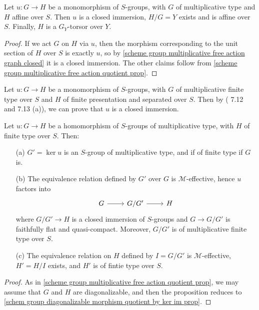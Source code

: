 \begin{corollary}\label{scheme group mono multiplicative to affine prop}
Let $u:G\to H$ be a monomorphism of $S$-groups, with $G$ of multiplicative type and $H$ affine over $S$. Then $u$ is a closed immersion, $H/G=Y$ exists and is affine over $S$. Finally, $H$ is a $G_Y$-torsor over $Y$.
\end{corollary}
\begin{proof}
If we act $G$ on $H$ via $u$, then the morphism corresponding to the unit section of $H$ over $S$ is exactly $u$, so by \cref{scheme group multiplicative free action graph closed} it is a closed immersion. The other claims follow from \cref{scheme group multiplicative free action quotient prop}.
\end{proof}

\begin{remark}\label{scheme group mono multiplicative to fp sp prop}
Let $u:G\to H$ be a monomorphism of $S$-groups, with $G$ of multiplicative finite type over $S$ and $H$ of finite presentation and separated over $S$. Then by (\cite{SGA3-2}  7.12 and 7.13 (a)), we can prove that $u$ is a closed immersion.
\end{remark}

\begin{proposition}\label{scheme group multiplicative morphism factorization}
Let $u:G\to H$ be a homomorphism of $S$-groups of multiplicative type, with $H$ of finite type over $S$. Then:
\begin{enumerate}
    \item[(a)] $G'=\ker u$ is an $S$-group of multiplicative type, and if of finite type if $G$ is.
    \item[(b)] The equivalence relation defined by $G'$ over $G$ is $\mathcal{M}$-effective, hence $u$ factors into
    \[\begin{tikzcd}
    G\ar[r]&G/G'\ar[r]&H
    \end{tikzcd}\]
    where $G/G'\to H$ is a closed immersion of $S$-groups and $G\to G/G'$ is faithfully flat and quasi-compact. Moreover, $G/G'$ is of multiplicative finite type over $S$.
    \item[(c)] The equivalence relation on $H$ defined by $I=G/G'$ is $\mathcal{M}$-effective, $H'=H/I$ exists, and $H'$ is of fintie type over $S$.
\end{enumerate}
\end{proposition}
\begin{proof}
As in \cref{scheme group multiplicative free action quotient prop}, we may assume that $G$ and $H$ are diagonalizable, and then the proposition reduces to \cref{schem group diagonalizable morphism quotient by ker im prop}.
\end{proof}

